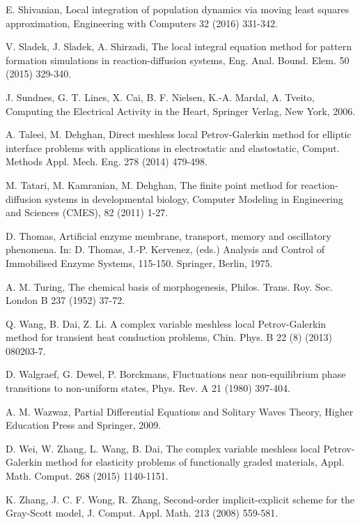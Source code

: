 \documentclass[12pt]{article}
\numberwithin{equation}{section}
\begin{document}
\begin{thebibliography}{99}
 E. Shivanian, Local integration of population dynamics via moving least squares approximation,
Engineering with Computers 32 (2016) 331-342.

 V. Sladek, J. Sladek, A. Shirzadi, The local integral equation method for pattern formation
simulations in reaction-diffusion systems, Eng. Anal. Bound. Elem. 50 (2015) 329-340.

 J. Sundnes, G. T. Lines, X. Cai, B. F. Nielsen,  K.-A. Mardal, A. Tveito, Computing the Electrical Activity in the Heart, 
Springer Verlag, New York, 2006.

 A. Taleei, M. Dehghan, Direct meshless local Petrov-Galerkin method for elliptic interface
problems with applications in electrostatic and elastostatic,
Comput. Methods Appl. Mech. Eng. 278 (2014) 479-498.

 M. Tatari, M. Kamranian, M. Dehghan, The finite point method for reaction-diffusion systems in developmental biology, 
Computer Modeling in Engineering and Sciences (CMES), 82 (2011) 1-27.

 D. Thomas, Artificial enzyme membrane, transport, memory and oscillatory phenomena. In: D. Thomas, J.-P.
Kervenez,  (eds.) Analysis and Control of Immobilised Enzyme Systems,  115-150. Springer,
Berlin, 1975.

 A. M. Turing, The chemical basis of morphogenesis, Philos. Trans. Roy. Soc. London B 237 (1952) 37-72.

 Q. Wang, B. Dai, Z. Li. A complex variable meshless local Petrov-Galerkin method for transient heat conduction problems,
 Chin. Phys. B  22 (8) (2013) 080203-7.

 D. Walgraef, G. Dewel, P. Borckmans, Fluctuations near non-equilibrium phase transitions to non-uniform states, 
Phys. Rev. A 21 (1980) 397-404.


 A. M. Wazwaz, Partial Differential Equations and Solitary Waves Theory, Higher Education Press and Springer,  2009.


 D. Wei, W. Zhang, L. Wang, B. Dai, The complex variable meshless local Petrov-Galerkin method for elasticity problems of 
functionally graded materials, Appl. Math. Comput. 268 (2015) 1140-1151.

 K. Zhang, J. C. F. Wong, R. Zhang, Second-order implicit-explicit scheme for the Gray-Scott model, J. Comput. Appl. Math. 213 (2008) 559-581.


\end{thebibliography}
\end{document}
